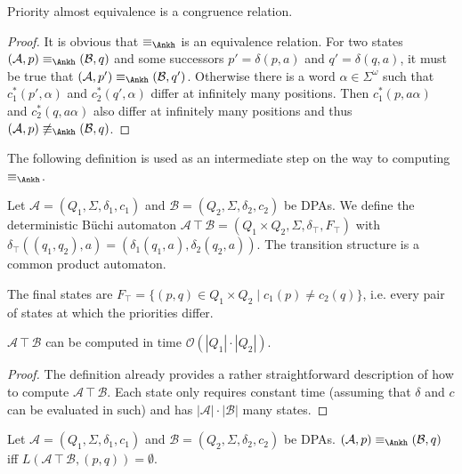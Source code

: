 \begin{lem}
	Priority almost equivalence is a congruence relation.
	\label{lem:general:Ankh_congruence}
\end{lem}

\begin{proof} 
	It is obvious that $\equiv_\text{\Ankh}$ is an equivalence relation. For two states $(\mathcal{A}, p) \equiv_\text{\Ankh} (\mathcal{B}, q)$ and some successors $p' = \delta(p, a)$ and $q' = \delta(q, a)$, it must be true that $(\mathcal{A}, p') \equiv_\text{\Ankh} (\mathcal{B}, q')$. Otherwise there is a word $\alpha \in \Sigma^\omega$ such that $c_1^*(p', \alpha)$ and $c_2^*(q', \alpha)$ differ at infinitely many positions. Then $c_1^*(p, a \alpha)$ and $c_2^*(q, a \alpha)$ also differ at infinitely many positions and thus $(\mathcal{A}, p) \not\equiv_\text{\Ankh} (\mathcal{B}, q)$.
\end{proof}

The following definition is used as an intermediate step on the way to computing $\equiv_\text{\Ankh}$.

\begin{defn}
	Let $\mathcal{A} = (Q_1, \Sigma, \delta_1, c_1)$ and $\mathcal{B} = (Q_2, \Sigma, \delta_2, c_2)$ be DPAs. We define the deterministic Büchi automaton $\mathcal{A} \intercal \mathcal{B} = (Q_1 \times Q_2, \Sigma, \delta_\intercal, F_\intercal)$ with $\delta_\intercal((q_1, q_2), a) = (\delta_1(q_1, a), \delta_2(q_2, a))$. The transition structure is a common product automaton.
	
	The final states are $F_\intercal = \{ (p, q) \in Q_1 \times Q_2 \mid c_1(p) \neq c_2(q) \}$, i.e. every pair of states at which the priorities differ. 
\end{defn}

\begin{lem}
	$\mathcal{A} \intercal \mathcal{B}$ can be computed in time $\mathcal{O}(|Q_1| \cdot |Q_2|)$.
	\label{lem:general:intercal_runtime}
\end{lem}

\begin{proof}
	The definition already provides a rather straightforward description of how to compute $\mathcal{A} \intercal \mathcal{B}$. Each state only requires constant time (assuming that $\delta$ and $c$ can be evaluated in such) and has $|\mathcal{A}| \cdot |\mathcal{B}|$ many states.
\end{proof}

\begin{lem}
	Let $\mathcal{A} = (Q_1, \Sigma, \delta_1, c_1)$ and $\mathcal{B} = (Q_2, \Sigma, \delta_2, c_2)$ be DPAs. $(\mathcal{A}, p) \equiv_\text{\Ankh} (\mathcal{B}, q)$ iff $L(\mathcal{A} \intercal \mathcal{B}, (p, q)) = \emptyset$. 
	\label{lem:general:intercal_prioalmostequiv}
\end{lem}

